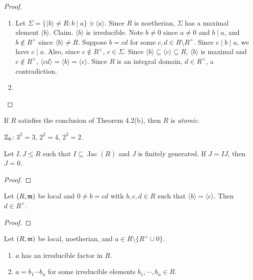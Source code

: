 \begin{proof}
    \begin{enumerate}
        \item Let $\Sigma = \{\langle b \rangle \neq R : b \mid a\} \ni \langle a \rangle$. Since $R$ is noetherian, $\Sigma$ has a maximal element $\langle b \rangle$. Claim. $\langle b \rangle$ is irreducible. Note $b \neq 0$ since $a \neq 0$ and $b \mid a$, and $b \not \in R^{\times}$ since $\langle b \rangle \neq R$. Suppose $b = cd$ for some $c,d \in R \setminus R^{\times}$. Since $c \mid b \mid a$, we have $c \mid a$. Also, since $c \not \in R^{\times}$, $c \in \Sigma$. Since $\langle b \rangle \subseteq \langle c \rangle \subseteq R$, $\langle b \rangle$ is maximal and $c \not \in R^{\times}$, $\langle cd \rangle = \langle b \rangle = \langle c \rangle$. Since $R$ is an integral domain, $d \in R^{\times}$, a contradiction.
        \item \qedhere
    \end{enumerate}
\end{proof}

\begin{definition}
    If $R$ satisfies the conclusion of Theorem 4.2(b), then $R$ is \emph {atomic}.
\end{definition}

\begin{example}
    $\mathbb{Z}_6$: $3^{2} = 3$, $2^{2} = 4$, $2^{3} = 2$.
\end{example}

\begin{lemma}
    Let $I,J \leq R$ such that $I \subseteq \operatorname{Jac}(R)$ and $J$ is finitely generated. If $J = IJ$, then $J = 0$.
\end{lemma}

\begin{proof}
\end{proof}

\begin{lemma}
    Let $(R,\mathfrak{m})$ be local and $0 \neq b = cd$ with $b,c,d \in R$ such that $\langle b \rangle = \langle c \rangle$. Then $d \in R^{\times}$.
\end{lemma}

\begin{proof}
\end{proof}

\begin{theorem}
    Let $(R,\mathfrak{m})$ be local, noetherian, and $a \in R \setminus \{R^{\times} \cup 0\}$. 
    \begin{enumerate}
        \item $a$ has an irreducible factor in $R$.
        \item $a = b_1 \cdots b_n$ for some irreducible elements $b_1,\cdots,b_n \in R$.
    \end{enumerate}
\end{theorem}


